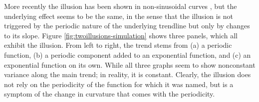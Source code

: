 \documentclass[11pt]{isuthesis}\usepackage[]{graphicx}\usepackage[]{color}
\begin{document}
More recently the illusion has been shown in non-sinusoidal curves \citep{cleveland:1984, schonlau:2003, robbins:2005, parallelsets}, but the underlying effect seems to be the same, in the sense that the illusion is not triggered by the periodic nature of the underlying trendline but only by  changes to its slope. Figure \ref{fig:twoillusions-simulation} shows three panels, which all exhibit the illusion. From left to right, the trend stems from (a) a periodic function, (b) a periodic component added to an exponential function, and (c) an exponential function on its own.
While all three graphs seem to show nonconstant variance along the main trend; in reality, it is constant. Clearly, the illusion does not rely on the periodicity of the function for which it was named, but is a symptom of the change in curvature that comes with the periodicity.
\end{document}
